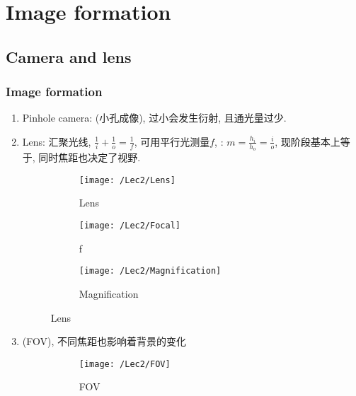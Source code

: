 \chapter{Image formation}

\section{Camera and lens}

    \subsection{Image formation}
    \begin{enumerate}
        \item Pinhole camera: (小孔成像), 过小会发生衍射, 且通光量过少.
        \item Lens: 汇聚光线, $\frac{1}{i}+\frac{1}{o}=\frac{1}{f}$, 可用平行光测量$f$, : $m=\frac{h_i}{h_o}=\frac{i}{o}$, 现阶段基本上等于, 同时焦距也决定了视野.
        \begin{figure}[H]
            \begin{subfigure}{0.33\textwidth}
                    \centering
                    \texttt{[image: /Lec2/Lens]}
                    \caption{Lens}
            \end{subfigure}
            \begin{subfigure}{0.33\textwidth}
                \centering
                \texttt{[image: /Lec2/Focal]}
                \caption{f}
            \end{subfigure}
            \begin{subfigure}{0.33\textwidth}
                \centering
                \texttt{[image: /Lec2/Magnification]}
                \caption{Magnification}
            \end{subfigure}
            \caption{Lens}
        \end{figure}
        \item {}(FOV), 不同焦距也影响着背景的变化
        \begin{figure}[H]
            \begin{subfigure}{0.33\textwidth}
                \centering
                \texttt{[image: /Lec2/FOV]}
                \caption{FOV}
            \end{subfigure}
            \begin{subfigure}{0.33\textwidth}

\end{subfigure}
\end{figure}
\end{enumerate}

